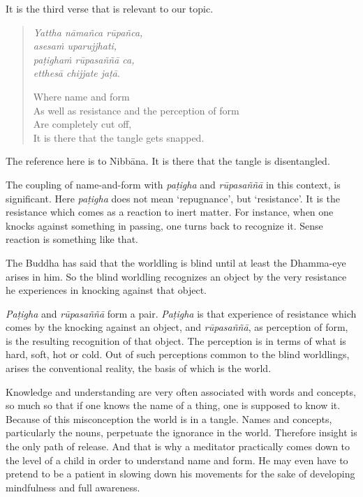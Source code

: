 It is the third verse that is relevant to our topic.

\begin{quote}
\emph{Yattha nāmañca rūpañca,}\\
\emph{asesaṁ uparujjhati,}\\
\emph{paṭighaṁ rūpasaññā ca,}\\
\emph{etthesā chijjate jaṭā}.

Where name and form\\
As well as resistance and the perception of form\\
Are completely cut off,\\
It is there that the tangle gets snapped.
\end{quote}

The reference here is to Nibbāna. It is there that the tangle is disentangled.

The coupling of name-and-form with \emph{paṭigha} and \emph{rūpasaññā} in this context, is significant. Here \emph{paṭigha} does not mean `repugnance', but `resistance'. It is the resistance which comes as a reaction to inert matter. For instance, when one knocks against something in passing, one turns back to recognize it. Sense reaction is something like that.

The Buddha has said that the worldling is blind until at least the Dhamma-eye arises in him. So the blind worldling recognizes an object by the very resistance he experiences in knocking against that object.

\emph{Paṭigha} and \emph{rūpasaññā} form a pair. \emph{Paṭigha} is that experience of resistance which comes by the knocking against an object, and \emph{rūpasaññā}, as perception of form, is the resulting recognition of that object. The perception is in terms of what is hard, soft, hot or cold. Out of such perceptions common to the blind worldlings, arises the conventional reality, the basis of which is the world.

Knowledge and understanding are very often associated with words and concepts, so much so that if one knows the name of a thing, one is supposed to know it. Because of this misconception the world is in a tangle. Names and concepts, particularly the nouns, perpetuate the ignorance in the world. Therefore insight is the only path of release. And that is why a meditator practically comes down to the level of a child in order to understand name and form. He may even have to pretend to be a patient in slowing down his movements for the sake of developing mindfulness and full awareness.

